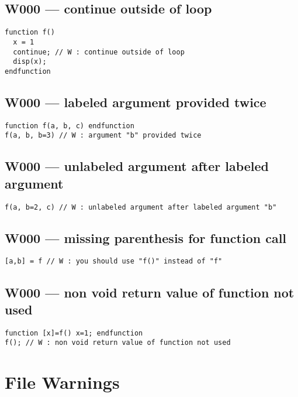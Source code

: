 \subsection{W000 --- continue outside of loop}


\begin{verbatim}
function f()
  x = 1
  continue; // W : continue outside of loop
  disp(x);
endfunction
\end{verbatim}


\subsection{W000 --- labeled argument provided twice}


\begin{verbatim}
function f(a, b, c) endfunction
f(a, b, b=3) // W : argument "b" provided twice
\end{verbatim}


\subsection{W000 --- unlabeled argument after labeled argument}


\begin{verbatim}
f(a, b=2, c) // W : unlabeled argument after labeled argument "b"
\end{verbatim}


\subsection{W000 --- missing parenthesis for function call}


\begin{verbatim}
[a,b] = f // W : you should use "f()" instead of "f"
\end{verbatim}


\subsection{W000 --- non void return value of function not used}


\begin{verbatim}
function [x]=f() x=1; endfunction
f(); // W : non void return value of function not used

\end{verbatim}


\section{File Warnings}

